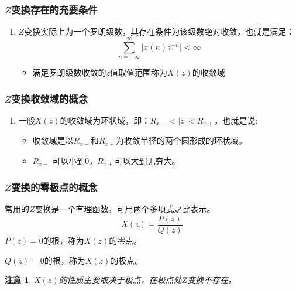 \documentclass[notheorems,compress,mathserif,table]{beamer}
\newtheorem{zhuyi}{注意}
\begin{document}
\begin{frame}\frametitle{$Z$变换存在的充要条件}%
\begin{enumerate}
\item [(1)]
$Z$变换实际上为一个罗朗级数，其存在条件为该级数绝对收敛，也就是满足：
$$\sum_{n=-\infty}^{\infty}|x(n)z^{-n}|  <\infty $$
\begin{itemize}
\item 满足罗朗级数收敛的$z$值取值范围称为$X(z)$的收敛域
\end{itemize}
\end{enumerate}
\end{frame}

\begin{frame}[shrink]\frametitle{$Z$变换收敛域的概念}%
\begin{enumerate}
\item [(2)]一般$X(z)$的收敛域为环状域，即：$R_{x-}<|z|<R_{x+}$，也就是说:
\begin{itemize}
\item 收敛域是以$R_{x-}$和$R_{x+}$为收敛半径的两个圆形成的环状域。 \newline
\item $R_{x-}$ 可以小到$0$，$R_{x+}$可以大到无穷大。
\end{itemize}

\end{enumerate}

\end{frame}

\begin{frame}\frametitle{$Z$变换的零极点的概念}%

常用的$Z$变换是一个有理函数，可用两个多项式之比表示。
$$X(z) = \frac{P(z)}{Q(z)}$$
$P(z)=0$的根，称为$X(z)$的零点。\par

$Q(z)=0$的根，称为$X(z)$的极点。\par
\begin{zhuyi}
$X(z)$的性质主要取决于极点，在极点处$Z$变换不存在。
\end{zhuyi}
\end{frame}
\end{document}
